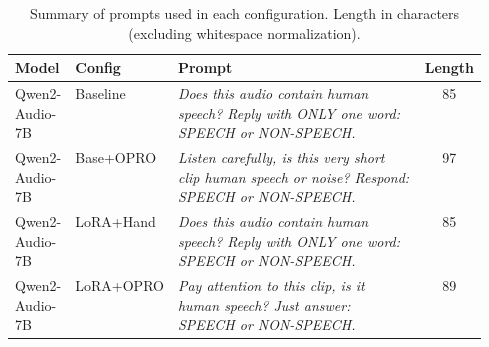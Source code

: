 \begin{table}[t]
\centering
\caption{Summary of prompts used in each configuration. Length in characters (excluding whitespace normalization).}
\label{tab:prompt_summary}
\footnotesize
\setlength{\tabcolsep}{3pt}
\renewcommand{\arraystretch}{1.15}
\begin{tabular}{llp{0.55\linewidth}c}
\toprule
\textbf{Model} & \textbf{Config} & \textbf{Prompt} & \textbf{Length} \\
\midrule
Qwen2-Audio-7B & Baseline & \textit{Does this audio contain human speech? Reply with ONLY one word: SPEECH or NON-SPEECH.} & 85 \\
Qwen2-Audio-7B & Base+OPRO & \textit{Listen carefully, is this very short clip human speech or noise? Respond: SPEECH or NON-SPEECH.} & 97 \\
Qwen2-Audio-7B & LoRA+Hand & \textit{Does this audio contain human speech? Reply with ONLY one word: SPEECH or NON-SPEECH.} & 85 \\
Qwen2-Audio-7B & LoRA+OPRO & \textit{Pay attention to this clip, is it human speech? Just answer: SPEECH or NON-SPEECH.} & 89 \\
\bottomrule
\end{tabular}
\end{table}
